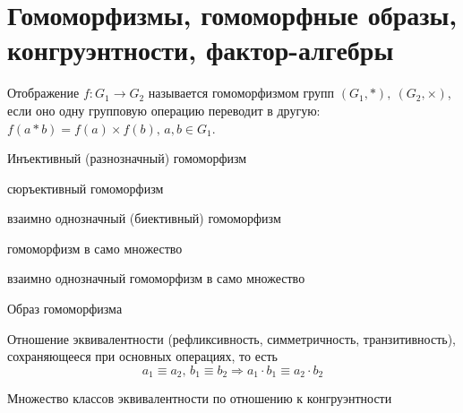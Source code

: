 \documentclass[../main/document.tex]{subfiles}
\begin{document}
\section{Гомоморфизмы, гомоморфные образы,\\ конгруэнтности, фактор-алгебры}
\begin{dfn}[Гомоморфизм]
Отображение $f \colon G_1 \to G_2$ называется гомоморфизмом групп $(G_1,*), ~(G_2,\times)$, если оно одну групповую операцию переводит в другую: $f(a*b)=f(a)\times f(b),\, a,b\in G_1$.
\end{dfn}
\begin{dfn}[Мономорфизм]
Инъективный (разнозначный) гомоморфизм
\end{dfn}
\begin{exm}

\end{exm}
\begin{dfn}[Эпиморфизм]
сюръективный гомоморфизм
\end{dfn}
\begin{exm}

\end{exm}
\begin{dfn}[Изоморфизм]
взаимно однозначный (биективный) гомоморфизм
\end{dfn}
\begin{exm}

\end{exm}
\begin{dfn}[Эндоморфизм]
гомоморфизм в само множество
\end{dfn}
\begin{exm}

\end{exm}
\begin{dfn}[Автоморфизм]
взаимно однозначный гомоморфизм в само множество
\end{dfn}
\begin{exm}

\end{exm}
\begin{dfn}
Образ гомоморфизма
\end{dfn}
\begin{exm}

\end{exm}
\begin{dfn}[Конгруэнтность]
Отношение эквивалентности (рефликсивность, симметричность, транзитивность), сохраняющееся при основных операциях, то есть 
$$a_1\equiv a_2,\, b_1\equiv b_2\Rightarrow a_1\cdot b_1\equiv a_2\cdot b_2$$
\end{dfn}
\begin{dfn}
Множество классов эквивалентности по отношению к конгруэнтности
\end{dfn}
\end{document}

